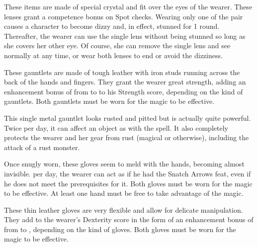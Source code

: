  These items are made of special crystal and fit over the eyes of the wearer. These lenses grant a  competence bonus on Spot checks. Wearing only one of the pair causes a character to become dizzy and, in effect, stunned for 1 round. Thereafter, the wearer can use the single lens without being stunned so long as she covers her other eye. Of course, she can remove the single lens and see normally at any time, or wear both lenses to end or avoid the dizziness.

 These gauntlets are made of tough leather with iron studs running across the back of the hands and fingers. They grant the wearer great strength, adding an enhancement bonus of from  to  to his Strength score, depending on the kind of gauntlets. Both gauntlets must be worn for the magic to be effective.

 This single metal gauntlet looks rusted and pitted but is actually quite powerful. Twice per day, it can affect an object as with the  spell. It also completely protects the wearer and her gear from rust (magical or otherwise), including the attack of a rust monster.

 Once snugly worn, these gloves seem to meld with the hands, becoming almost invisible.  per day, the wearer can act as if he had the Snatch Arrows feat, even if he does not meet the prerequisites for it. Both gloves must be worn for the magic to be effective. At least one hand must be free to take advantage of the magic.

 These thin leather gloves are very flexible and allow for delicate manipulation. They add to the wearer's Dexterity score in the form of an enhancement bonus of from  to , depending on the kind of gloves. Both gloves must be worn for the magic to be effective.

